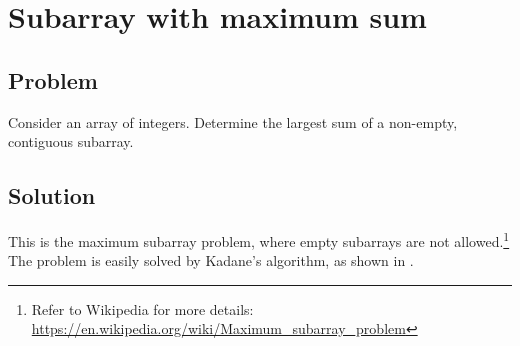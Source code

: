 
\section{Subarray with maximum sum}



\subsection*{Problem}

Consider an array of integers.  Determine the largest sum of a
non-empty, contiguous subarray.



\subsection*{Solution}

This is the maximum subarray problem, where empty subarrays are not
allowed.\footnote{
  Refer to Wikipedia for more details:
  \url{https://en.wikipedia.org/wiki/Maximum_subarray_problem}
}
The problem is easily solved by Kadane's algorithm, as shown in
.

\begin{algorithm}[!htbp]

\caption{%
  Kadane's algorithm.
}
\label{alg:subarray:kadane}
\end{algorithm}
